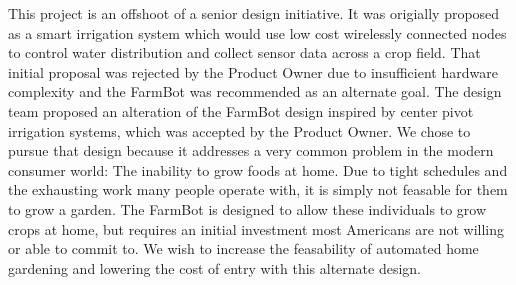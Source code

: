 This project is an offshoot of a senior design initiative. It was origially proposed as a smart irrigation system which would use low cost wirelessly connected nodes to control water distribution and collect sensor data across a crop field. That initial proposal was rejected by the Product Owner due to insufficient hardware complexity and the FarmBot was recommended as an alternate goal. The design team proposed an alteration of the FarmBot design inspired by center pivot irrigation systems, which was accepted by the Product Owner. We chose to pursue that design because it addresses a very common problem in the modern consumer world: The inability to grow foods at home. Due to tight schedules and the exhausting work many people operate with, it is simply not feasable for them to grow a garden. The FarmBot is designed to allow these individuals to grow crops at home, but requires an initial investment most Americans are not willing or able to commit to. We wish to increase the feasability of automated home gardening and lowering the cost of entry with this alternate design.
